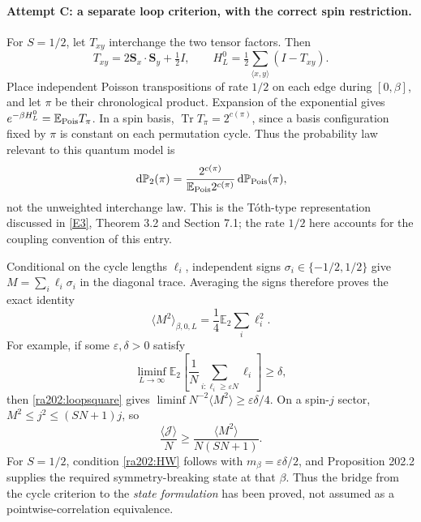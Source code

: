 \documentclass[11pt]{article}
\newcommand{\eps}{\varepsilon}
\newcommand{\dd}{\,\mathrm d}
\newcommand{\eref}[2]{\hyperlink{extra:#1:#2}{[E#2]}}
\begin{document}
	\paragraph{Attempt C: a separate loop criterion, with the correct spin restriction.}
	For $S=1/2$, let $T_{xy}$ interchange the two tensor factors. Then
	\[
	T_{xy}=2\mathbf S_x\cdot\mathbf S_y+\tfrac12I,
	\qquad H_L^0=\tfrac12\sum_{\langle x,y\rangle}(I-T_{xy}).
	\]
	Place independent Poisson transpositions of rate $1/2$ on each edge
	during $[0,\beta]$, and let $\pi$ be their chronological product.
	Expansion of the exponential gives
	$e^{-\beta H_L^0}=\mathbb E_{\rm Pois}T_\pi$.
	In a spin basis, $\operatorname{Tr}T_\pi=2^{c(\pi)}$, since a basis
	configuration fixed by $\pi$ is constant on each permutation cycle.
	Thus the probability law relevant to this quantum model is
	\begin{equation}\label{ra202:looplaw}
		\dd\mathbb P_2(\pi)=
		\frac{2^{c(\pi)}}{\mathbb E_{\rm Pois}2^{c(\pi)}}
		\dd\mathbb P_{\rm Pois}(\pi),
	\end{equation}
	not the unweighted interchange law. This is the T\'oth-type
	representation discussed in \eref{202}{3}, Theorem 3.2 and Section 7.1;
	the rate $1/2$ here accounts for the coupling convention of this entry.
	
	Conditional on the cycle lengths $\ell_i$, independent signs
	$\sigma_i\in\{-1/2,1/2\}$ give
	$M=\sum_i\ell_i\sigma_i$ in the diagonal trace. Averaging the signs
	therefore proves the exact identity
	\begin{equation}\label{ra202:loopsquare}
		\langle M^2\rangle_{\beta,0,L}
		=\frac14\mathbb E_2\sum_i\ell_i^2.
	\end{equation}
	For example, if some $\eps,\delta>0$ satisfy
	\begin{equation}\label{ra202:loopgoal}
		\liminf_{L\to\infty}\mathbb E_2
		\left[\frac1N\sum_{i:\ell_i\geq\eps N}\ell_i\right]\geq\delta,
	\end{equation}
	then \eqref{ra202:loopsquare} gives
	$\liminf N^{-2}\langle M^2\rangle\geq\eps\delta/4$.
	On a spin-$j$ sector, $M^2\leq j^2\leq(SN+1)j$, so
	\[
	\frac{\langle\mathcal J\rangle}{N}
	\geq\frac{\langle M^2\rangle}{N(SN+1)}.
	\]
	For $S=1/2$, condition \eqref{ra202:HW} follows with
	$m_\beta=\eps\delta/2$, and Proposition 202.2 supplies the required
	symmetry-breaking state at that $\beta$. Thus the bridge from the
	cycle criterion to the \emph{state formulation} has been proved, not
	assumed as a pointwise-correlation equivalence.
	
\end{document}
